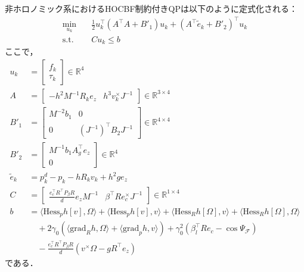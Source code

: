 非ホロノミック系におけるHOCBF制約付きQPは以下のように定式化される：
\begin{equation}
\begin{aligned}
\min_{u_k} \quad & \frac{1}{2} u_k^\top (A^\top A + B'_1) u_k + (A^\top \tilde{e}_k + B'_2)^\top u_k \\
\mathrm{s.t.} \quad & C u_k \leq b
\label{eq:nonholonomic_qp}
\end{aligned}
\end{equation}
ここで，
\begin{equation}
\begin{aligned}
u_k &= \begin{bmatrix} f_k \\ \tau_k \end{bmatrix} \in \mathbb{R}^4 \\
A &= \begin{bmatrix} -h^2 M^{-1} R_k e_z & h^3 v_k^\times J^{-1} \end{bmatrix} \in \mathbb{R}^{3 \times 4} \\
B'_1 &= \begin{bmatrix} M^{-2} b_1 & 0 \\ 0 & (J^{-1})^\top B_2 J^{-1} \end{bmatrix} \in \mathbb{R}^{4 \times 4} \\
B'_2 &= \begin{bmatrix} M^{-1} b_1 A_g^\top e_z \\ 0 \end{bmatrix} \in \mathbb{R}^4 \\
\tilde{e}_k &= p^d_k - p_k - h R_k v_k + h^2 g e_z \\
C &= \begin{bmatrix} \frac{e_c^\top R^\top P_\beta R}{d} e_z M^{-1} & \beta^\top R e_c^\times J^{-1} \end{bmatrix} \in \mathbb{R}^{1 \times 4} \\
b &= \langle \mathrm{Hess}_p h[v], \Omega \rangle + \langle \mathrm{Hess}_p h[v], v \rangle + \langle \mathrm{Hess}_R h[\Omega], v \rangle + \langle \mathrm{Hess}_R h[\Omega], \Omega \rangle \\
&\quad + 2\gamma_0 (\langle \mathrm{grad}_R h, \Omega \rangle + \langle \mathrm{grad}_p h, v \rangle) + \gamma_0^2 (\beta_l^\top R e_c - \cos\Psi_{\mathcal{F}}) \\
&\quad - \frac{e_c^\top R^\top P_\beta R}{d} (v^\times \Omega - g R^\top e_z)
\label{eq:nonholonomic_qp_params}
\end{aligned}
\end{equation}
である．

